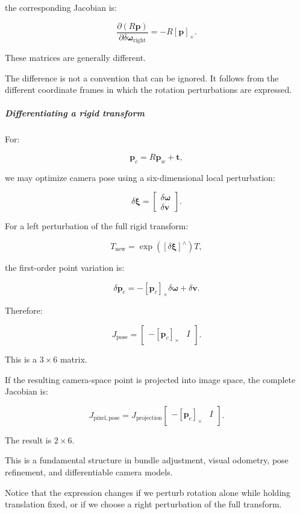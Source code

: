 the corresponding Jacobian is:

\[
\boxed{ \frac{\partial(R\mathbf p)} {\partial\delta\boldsymbol\omega_{\mathrm{right}}} = -R[\mathbf p]_\times }.
\]

These matrices are generally different.

The difference is not a convention that can be ignored. It follows from the different coordinate frames in which the rotation perturbations are expressed.

\subparagraph{Differentiating a rigid transform}\label{differentiating-a-rigid-transform}

For:

\[
\mathbf p_c=R\mathbf p_w+\mathbf t,
\]

we may optimize camera pose using a six-dimensional local perturbation:

\[
\delta\boldsymbol\xi= \begin{bmatrix} \delta\boldsymbol\omega\\ \delta\mathbf v \end{bmatrix}.
\]

For a left perturbation of the full rigid transform:

\[
T_{\mathrm{new}}= \exp([\delta\boldsymbol\xi]^\wedge)T,
\]

the first-order point variation is:

\[
\delta\mathbf p_c = -[\mathbf p_c]_\times\delta\boldsymbol\omega +\delta\mathbf v.
\]

Therefore:

\[
\boxed{ J_{\mathrm{pose}} = \begin{bmatrix} -[\mathbf p_c]_\times&I \end{bmatrix} }.
\]

This is a \(3\times6\) matrix.

If the resulting camera-space point is projected into image space, the complete Jacobian is:

\[
\boxed{ J_{\mathrm{pixel,pose}} = J_{\mathrm{projection}} \begin{bmatrix} -[\mathbf p_c]_\times&I \end{bmatrix} }.
\]

The result is \(2\times6\).

This is a fundamental structure in bundle adjustment, visual odometry, pose refinement, and differentiable camera models.

Notice that the expression changes if we perturb rotation alone while holding translation fixed, or if we choose a right perturbation of the full transform.


